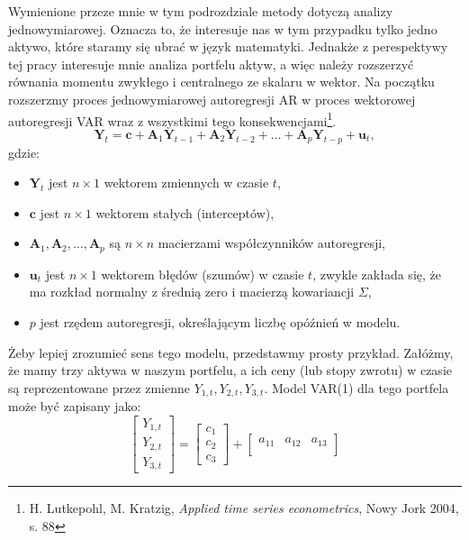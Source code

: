 \begin{enumerate}
Wymienione przeze mnie w tym podrozdziale metody dotyczą analizy jednowymiarowej. Oznacza to, że interesuje nas w tym przypadku tylko jedno aktywo, które staramy się ubrać w język matematyki. Jednakże z perespektywy tej pracy interesuje mnie analiza portfelu aktyw, a więc należy rozszerzyć równania momentu zwykłego i centralnego ze skalaru w wektor. Na początku rozszerzmy proces jednowymiarowej autoregresji AR w proces wektorowej autoregresji VAR wraz z wszystkimi tego konsekwencjami\footnote{H. Lutkepohl, M. Kratzig, \textit{Applied time series econometrics}, Nowy Jork 2004, s. 88}. 
\begin{equation}
\mathbf{Y}_t = \mathbf{c} + \mathbf{A}_1 \mathbf{Y}_{t-1} + \mathbf{A}_2 \mathbf{Y}_{t-2} + \ldots + \mathbf{A}_p \mathbf{Y}_{t-p} + \mathbf{u}_t,
\end{equation}
gdzie:
\begin{itemize}
  \item \( \mathbf{Y}_t \) jest \( n \times 1 \) wektorem zmiennych w czasie \( t \),
  \item \( \mathbf{c} \) jest \( n \times 1 \) wektorem stałych (interceptów),
  \item \( \mathbf{A}_1, \mathbf{A}_2, \ldots, \mathbf{A}_p \) są \( n \times n \) macierzami współczynników autoregresji,
  \item \( \mathbf{u}_t \) jest \( n \times 1 \) wektorem błędów (szumów) w czasie \( t \), zwykle zakłada się, że ma rozkład normalny z średnią zero i macierzą kowariancji \( \Sigma \),
  \item \( p \) jest rzędem autoregresji, określającym liczbę opóźnień w modelu.
\end{itemize}
Żeby lepiej zrozumieć sens tego modelu, przedstawmy prosty przykład. Załóżmy, że mamy trzy aktywa w naszym portfelu, a ich ceny (lub stopy zwrotu) w czasie są reprezentowane przez zmienne \( Y_{1,t}, Y_{2,t}, Y_{3,t} \). Model VAR(1) dla tego portfela może być zapisany jako:
\begin{equation}
\begin{bmatrix}
Y_{1,t} \\
Y_{2,t} \\
Y_{3,t}
\end{bmatrix}
=
\begin{bmatrix}
c_1 \\
c_2 \\
c_3
\end{bmatrix}
+
\begin{bmatrix}
a_{11} & a_{12} & a_{13} \\

\end{bmatrix}
\end{equation}
\end{enumerate}
